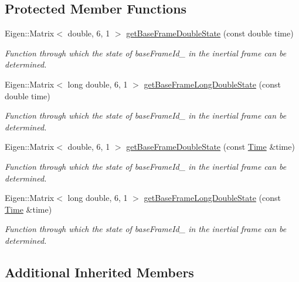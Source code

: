 \subsection*{Protected Member Functions}
\begin{DoxyCompactItemize}
\item 
Eigen\+::\+Matrix$<$ double, 6, 1 $>$ \hyperlink{classtudat_1_1simulation__setup_1_1BaseStateInterfaceImplementation_ae53c051e177df8641d07fbb7f50c1197}{get\+Base\+Frame\+Double\+State} (const double time)
\begin{DoxyCompactList}\small\item\em Function through which the state of base\+Frame\+Id\+\_\+ in the inertial frame can be determined. \end{DoxyCompactList}\item 
Eigen\+::\+Matrix$<$ long double, 6, 1 $>$ \hyperlink{classtudat_1_1simulation__setup_1_1BaseStateInterfaceImplementation_a0412c94ef47dfba9c26bd40b139004ad}{get\+Base\+Frame\+Long\+Double\+State} (const double time)
\begin{DoxyCompactList}\small\item\em Function through which the state of base\+Frame\+Id\+\_\+ in the inertial frame can be determined. \end{DoxyCompactList}\item 
Eigen\+::\+Matrix$<$ double, 6, 1 $>$ \hyperlink{classtudat_1_1simulation__setup_1_1BaseStateInterfaceImplementation_a9c86d9922b9358165f54a5012187606b}{get\+Base\+Frame\+Double\+State} (const \hyperlink{classtudat_1_1Time}{Time} \&time)
\begin{DoxyCompactList}\small\item\em Function through which the state of base\+Frame\+Id\+\_\+ in the inertial frame can be determined. \end{DoxyCompactList}\item 
Eigen\+::\+Matrix$<$ long double, 6, 1 $>$ \hyperlink{classtudat_1_1simulation__setup_1_1BaseStateInterfaceImplementation_aee56c9b426b0371c6744db8a7566511b}{get\+Base\+Frame\+Long\+Double\+State} (const \hyperlink{classtudat_1_1Time}{Time} \&time)
\begin{DoxyCompactList}\small\item\em Function through which the state of base\+Frame\+Id\+\_\+ in the inertial frame can be determined. \end{DoxyCompactList}\end{DoxyCompactItemize}
\subsection*{Additional Inherited Members}


